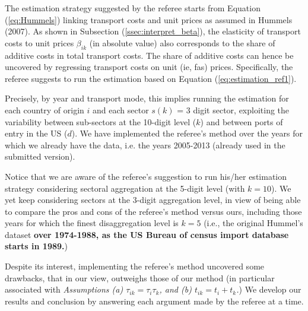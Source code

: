 \documentclass[a4paper,12pt]{article}
\begin{document}
The estimation strategy suggested by the referee starts from Equation (\ref{eq:Hummels}) linking transport costs and unit prices as assumed in Hummels (2007). As shown in Subsection (\ref{ssec:interpret_beta}), the elasticity of transport costs to unit prices $\beta_{ik}$ (in absolute value) also corresponds to the share of additive costs in total transport costs. The share of additive costs can hence be uncovered by regressing transport costs on unit (ie, fas) prices. Specifically, the referee suggests to run the estimation based on Equation (\ref{eq:estimation_ref1}).

Precisely, by year and transport mode, this implies running the estimation for each country of origin $i$ and each sector $s(k)$ = 3 digit sector, exploiting the variability between sub-sectors at the 10-digit level ($k$) and between ports of entry in the US ($d$). We have implemented the referee's method over the years for which we already have the data, i.e. the years 2005-2013 (already used in the submitted version).

Notice that we are aware of the referee's suggestion to run his/her estimation strategy considering sectoral aggregation at the 5-digit level (with $k=10$). We yet keep considering sectors at the 3-digit aggregation level, in view of being able to compare the pros and cons of the referee's method versus ours, including those years for which the finest disaggregation level is $k=5$ (i.e., the original Hummel's dataset \textbf{over 1974-1988, as the US Bureau of census import database starts in 1989.})

Despite its interest, implementing the referee's method uncovered some drawbacks, that in our view, outweighs those of our method (in particular associated with \textit{Assumptions (a) $\tau_{ik} = \tau_i\tau_{k}$, and (b) $t_{ik} = t_i+ t_{k}$.}) We develop our results and conclusion by answering each argument made by the referee at a time.
\end{document}
